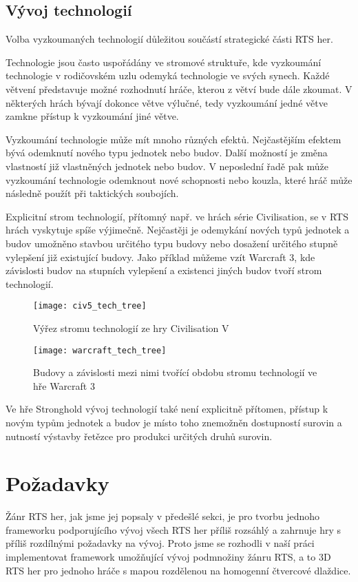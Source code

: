 \subsection{Vývoj technologií}
Volba vyzkoumaných technologií důležitou součástí strategické části RTS her. 

Technologie jsou často uspořádány ve stromové struktuře, kde vyzkoumání technologie v rodičovském uzlu odemyká technologie ve svých synech. Každé větvení představuje možné rozhodnutí hráče, kterou z větví bude dále zkoumat. V některých hrách bývají dokonce větve výlučné, tedy vyzkoumání jedné větve zamkne přístup k vyzkoumání jiné větve.

Vyzkoumání technologie může mít mnoho různých efektů. Nejčastějším efektem bývá odemknutí nového typu jednotek nebo budov. Další možností je změna vlastností již vlastněných jednotek nebo budov. V neposlední řadě pak může vyzkoumání technologie odemknout nové schopnosti nebo kouzla, které hráč může následně použít při taktických soubojích. 

Explicitní strom technologií, přítomný např. ve hrách série Civilisation, se v RTS hrách vyskytuje spíše výjimečně. Nejčastěji je odemykání nových typů jednotek a budov umožněno stavbou určitého typu budovy nebo dosažení určitého stupně vylepšení již existující budovy. Jako příklad můžeme vzít Warcraft 3, kde závislosti budov na stupních vylepšení a existenci jiných budov tvoří strom technologií. 

\begin{figure}[h]
	\caption{Výřez stromu technologií ze hry Civilisation V}
	\centering
	\texttt{[image: civ5\_tech\_tree]}
\end{figure}


\begin{figure}[h]
\caption{Budovy a závislosti mezi nimi tvořící obdobu stromu technologií ve hře Warcraft 3}
\centering
\texttt{[image: warcraft\_tech\_tree]}
\end{figure}

Ve hře Stronghold vývoj technologií také není explicitně přítomen, přístup k novým typům jednotek a budov je místo toho znemožněn dostupností surovin a nutností výstavby řetězce pro produkci určitých druhů surovin. 

\section{Požadavky}
Žánr RTS her, jak jsme jej popsaly v předešlé sekci, je pro tvorbu jednoho frameworku podporujícího vývoj všech RTS her příliš rozsáhlý a zahrnuje hry s příliš rozdílnými požadavky na vývoj. Proto jsme se rozhodli v naší práci implementovat framework umožňující vývoj podmnožiny žánru RTS, a to 3D RTS her pro jednoho hráče s mapou rozdělenou na homogenní čtvercové dlaždice. 

